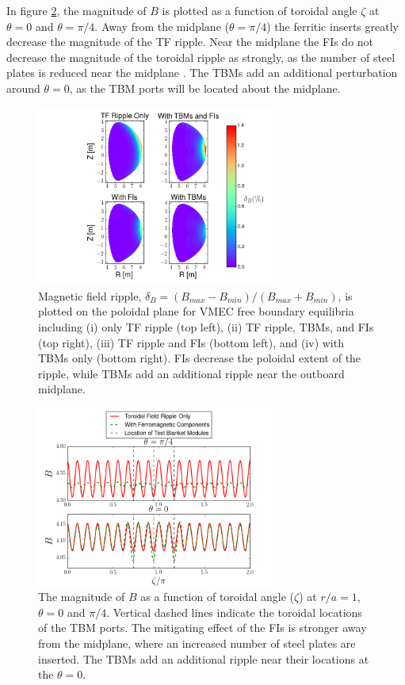 \documentclass{article}
\numberwithin{figure}{section}
\numberwithin{equation}{section}
\begin{document}
In figure \ref{fig:toroidalripple}, the magnitude of $B$ is plotted as a function of toroidal angle $\zeta$ at $\theta = 0$ and $\theta = \pi/4$. Away from the midplane ($\theta = \pi/4$) the ferritic inserts greatly decrease the magnitude of the TF ripple. Near the midplane the FIs do not decrease the magnitude of the toroidal ripple as strongly, as the number of steel plates is reduced near the midplane \cite{Shinohara2009}. The TBMs add an additional perturbation around $\theta = 0$, as the TBM ports will be located about the midplane. 

\FloatBarrier

\begin{figure}[h!]
\centering
\includegraphics[width=0.7\textwidth]{ripplecontour.png}
\caption{\label{fig:ripplecontour} Magnetic field ripple, $\delta_B = (B_{max}-B_{min})/(B_{max} + B_{min})$, is plotted on the poloidal plane for VMEC free boundary equilibria including (i) only TF ripple (top left), (ii) TF ripple, TBMs, and FIs (top right), (iii) TF ripple and FIs (bottom left), and (iv) with TBMs only (bottom right). FIs decrease the poloidal extent of the ripple, while TBMs add an additional ripple near the outboard midplane.}
\end{figure}

\begin{figure}[h!]
\centering
\includegraphics[width=0.7\textwidth]{toroidalripple.png}
\caption{\label{fig:toroidalripple} The magnitude of $B$ as a function of toroidal angle ($\zeta$) at $r/a = 1$, $\theta = 0$ and $\pi/4$. Vertical dashed lines indicate the toroidal locations of the TBM ports. The mitigating effect of the FIs is stronger away from the midplane, where an increased number of steel plates are inserted. The TBMs add an additional ripple near their locations at the $\theta = 0$. }
\end{figure}
\end{document}
